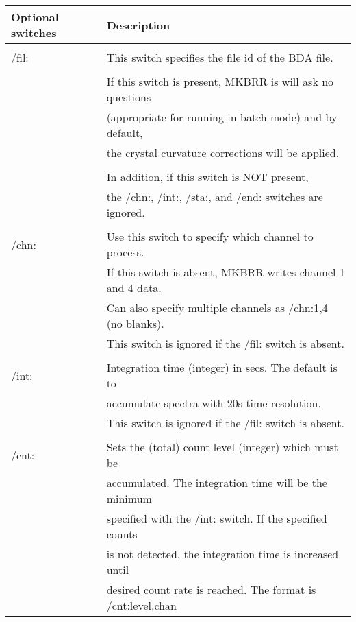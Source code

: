 \newpage

\begin{center}
\begin{tabular}{|l l|}
\hline
{\bf Optional switches} & {\bf Description}  \\
\hline
              &    \\

	/fil: & This switch specifies the file id of the BDA file.\\
              & \\
	      &	If this switch is present, MKBRR is will ask no questions \\
	      &	(appropriate for running in batch mode) and by default, \\
	      &	the crystal curvature corrections will be applied. \\
              &    \\
	      &	In addition, if this switch is NOT present,  \\
	      &	the /chn:, /int:, /sta:, and /end: switches are ignored. \\
              &    \\
	/chn: &	Use this switch to specify which channel to process.  \\
	      &	If this switch is absent, MKBRR writes channel 1 and 4 data. \\
              & Can also specify multiple channels as /chn:1,4 (no blanks). \\
              & This switch is ignored if the /fil: switch is absent. \\
              &  \\  
	/int: &	Integration time (integer) in secs.  The default is to  \\
              &  accumulate spectra with 20s time resolution. \\
              &  This switch is ignored if the /fil: switch is absent. \\
              &   \\          
	/cnt: &	Sets the (total) count level (integer) which must be  \\
              &  accumulated.  The integration time will be the minimum  \\
              &  specified with the /int: switch.  If the specified counts  \\
              &  is not detected, the integration time is increased until  \\
              &  desired count rate is reached.  The format is /cnt:level,chan \\

\end{tabular}
\end{center}
